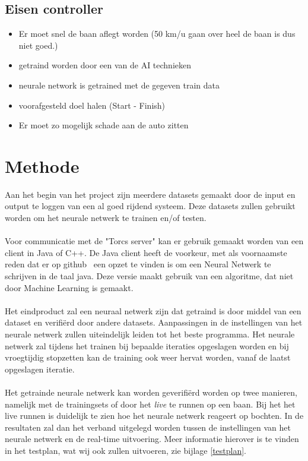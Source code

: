 \documentclass{article}
\begin{document}
\subsection*{Eisen controller}
\begin{itemize}
\item Er moet snel de baan aflegt worden (50 km/u gaan over heel de baan is dus niet goed.)
\item getraind worden door een van de AI technieken
\item neurale network is getrained met de gegeven train data
\item voorafgesteld doel halen (Start - Finish)
\item Er moet zo mogelijk schade aan de auto zitten
\end{itemize}

\pagebreak

\section{Methode}
Aan het begin van het project zijn meerdere datasets gemaakt door de input en output te loggen van een al goed rijdend systeem. Deze datasets zullen gebruikt worden om het neurale netwerk te trainen en/of testen.\\\\ 
Voor communicatie met de "Torcs server" kan er gebruik gemaakt worden van een client in Java of C++. De Java client heeft de voorkeur, met als voornaamste reden dat er op github~\cite{java-client} een opzet te vinden is om een Neural Netwerk te schrijven in de taal java. Deze versie maakt gebruik van een algoritme, dat niet door Machine Learning is gemaakt. \\\\
Het eindproduct zal een neuraal netwerk zijn dat getraind is door middel van een dataset en verifi\"erd door andere datasets. Aanpassingen in de instellingen van het neurale netwerk zullen uiteindelijk leiden tot het beste programma. Het neurale netwerk zal tijdens het trainen bij bepaalde iteraties opgeslagen worden en bij vroegtijdig stopzetten kan de training ook weer hervat worden, vanaf de laatst opgeslagen iteratie. \\\\
Het getrainde neurale netwerk kan worden geverifi\"erd worden op twee manieren, namelijk met de trainingsets of door het \textit{live} te runnen op een baan. Bij het het live runnen is duidelijk te zien hoe het neurale netwerk reageert op bochten. In de resultaten zal dan het verband uitgelegd worden tussen de instellingen van het neurale netwerk en de real-time uitvoering.  Meer informatie hierover is te vinden in het testplan, wat wij ook zullen uitvoeren, zie bijlage \ref{testplan}. \\\\
\pagebreak

\pagebreak
\end{document}
